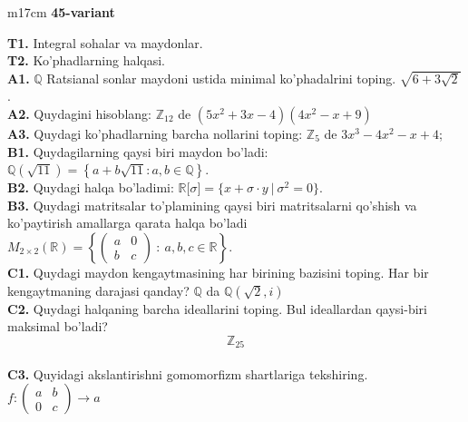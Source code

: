 \documentclass{article}
\begin{document}
\begin{tabular}{m{17cm}}
\textbf{45-variant}
\newline

\textbf{T1.} Integral sohalar va maydonlar. \\
\textbf{T2.} Ko'phadlarning halqasi. \\
\textbf{A1.} \(\mathbb{Q}\) Ratsianal sonlar maydoni ustida minimal ko'phadalrini toping.
\(\sqrt{6 + 3\sqrt{2}}\). \\
\textbf{A2.} Quydagini hisoblang:
\(\mathbb{Z}_{12}\) de \(\left( 5x^{2} + 3x - 4 \right)\left( 4x^{2} - x + 9 \right)\) \\
\textbf{A3.} Quydagi ko'phadlarning barcha nollarini toping:
\(\mathbb{Z}_{5}\) de \(3x^{3} - 4x^{2} - x + 4\); \\
\textbf{B1.} Quydagilarning qaysi biri maydon bo'ladi:
\(\mathbb{Q}\left( \sqrt{11} \right) = \left\{ a + b\sqrt{11}:a,b \in \mathbb{Q} \right\}\). \\
\textbf{B2.} Quydagi halqa bo'ladimi:
\(\mathbb{R\lbrack}\sigma\rbrack = \{ x + \sigma \cdot y\ |\ \sigma^{2} = 0\}\). \\
\textbf{B3.} Quydagi matritsalar to'plamining qaysi biri matritsalarni qo'shish va ko'paytirish amallarga qarata halqa bo'ladi
\(M_{2 \times 2}\mathbb{(R) =}\left\{ \begin{pmatrix}
a & 0 \\
b & c
\end{pmatrix}\ :\ a,b,c \in \mathbb{R} \right\}\). \\
\textbf{C1.} Quydagi maydon kengaytmasining har birining bazisini toping. Har bir kengaytmaning darajasi qanday?
\(\mathbb{Q}\) da \(\mathbb{Q}\left( \sqrt{2},i \right)\) \\
\textbf{C2.} Quydagi halqaning barcha ideallarini toping. Bul ideallardan qaysi-biri maksimal bo'ladi?
\[\mathbb{Z}_{25}\] \\
\textbf{C3.} Quyidagi akslantirishni gomomorfizm shartlariga tekshiring. \(f:\begin{pmatrix}
a & b \\
0 & c
\end{pmatrix} \rightarrow a\) \\

\end{tabular}
\vspace{1cm}
\end{document}

